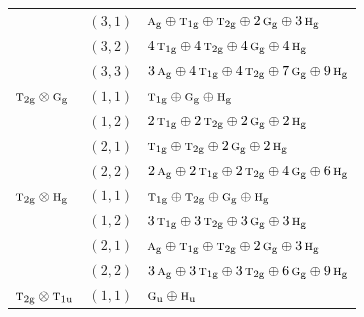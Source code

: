 \documentclass[11pt]{article}
\newcommand{\irr}[1]{\text{\normalfont\scshape #1}}
\newcommand{\ptag}[1]{\mathrm{#1}}
\begin{document}
\begin{longtable}{p{} c p{}}
 & $(3,1)$ & $\irr{a}_{\ptag{g}}\oplus \irr{t}_{1\ptag{g}}\oplus \irr{t}_{2\ptag{g}}\oplus 2\,\irr{g}_{\ptag{g}}\oplus 3\,\irr{h}_{\ptag{g}}$\\

 & $(3,2)$ & $4\,\irr{t}_{1\ptag{g}}\oplus 4\,\irr{t}_{2\ptag{g}}\oplus 4\,\irr{g}_{\ptag{g}}\oplus 4\,\irr{h}_{\ptag{g}}$\\

 & $(3,3)$ & $3\,\irr{a}_{\ptag{g}}\oplus 4\,\irr{t}_{1\ptag{g}}\oplus 4\,\irr{t}_{2\ptag{g}}\oplus 7\,\irr{g}_{\ptag{g}}\oplus 9\,\irr{h}_{\ptag{g}}$\\

\hline

$\irr{t}_{2\ptag{g}}\otimes \irr{g}_{\ptag{g}}$ & $(1,1)$ & $\irr{t}_{1\ptag{g}}\oplus \irr{g}_{\ptag{g}}\oplus \irr{h}_{\ptag{g}}$\\

 & $(1,2)$ & $2\,\irr{t}_{1\ptag{g}}\oplus 2\,\irr{t}_{2\ptag{g}}\oplus 2\,\irr{g}_{\ptag{g}}\oplus 2\,\irr{h}_{\ptag{g}}$\\

 & $(2,1)$ & $\irr{t}_{1\ptag{g}}\oplus \irr{t}_{2\ptag{g}}\oplus 2\,\irr{g}_{\ptag{g}}\oplus 2\,\irr{h}_{\ptag{g}}$\\

 & $(2,2)$ & $2\,\irr{a}_{\ptag{g}}\oplus 2\,\irr{t}_{1\ptag{g}}\oplus 2\,\irr{t}_{2\ptag{g}}\oplus 4\,\irr{g}_{\ptag{g}}\oplus 6\,\irr{h}_{\ptag{g}}$\\

\hline

$\irr{t}_{2\ptag{g}}\otimes \irr{h}_{\ptag{g}}$ & $(1,1)$ & $\irr{t}_{1\ptag{g}}\oplus \irr{t}_{2\ptag{g}}\oplus \irr{g}_{\ptag{g}}\oplus \irr{h}_{\ptag{g}}$\\

 & $(1,2)$ & $3\,\irr{t}_{1\ptag{g}}\oplus 3\,\irr{t}_{2\ptag{g}}\oplus 3\,\irr{g}_{\ptag{g}}\oplus 3\,\irr{h}_{\ptag{g}}$\\

 & $(2,1)$ & $\irr{a}_{\ptag{g}}\oplus \irr{t}_{1\ptag{g}}\oplus \irr{t}_{2\ptag{g}}\oplus 2\,\irr{g}_{\ptag{g}}\oplus 3\,\irr{h}_{\ptag{g}}$\\

 & $(2,2)$ & $3\,\irr{a}_{\ptag{g}}\oplus 3\,\irr{t}_{1\ptag{g}}\oplus 3\,\irr{t}_{2\ptag{g}}\oplus 6\,\irr{g}_{\ptag{g}}\oplus 9\,\irr{h}_{\ptag{g}}$\\

\hline

$\irr{t}_{2\ptag{g}}\otimes \irr{t}_{1\ptag{u}}$ & $(1,1)$ & $\irr{g}_{\ptag{u}}\oplus \irr{h}_{\ptag{u}}$\\


\end{longtable}
\end{document}
